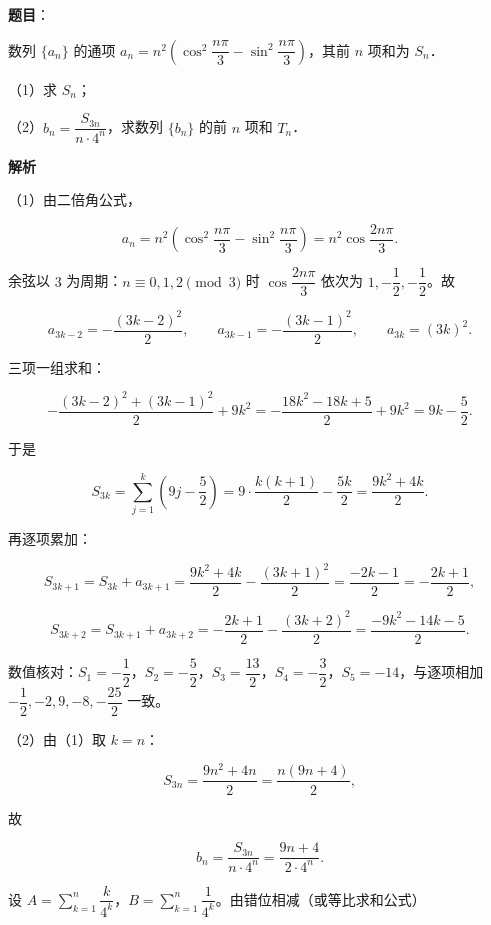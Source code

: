 \begin{answer}

\textbf{题目}：

数列 $\{a_n\}$ 的通项 $a_n=n^2\left(\cos^2\dfrac{n\pi}{3}-\sin^2\dfrac{n\pi}{3}\right)$，其前 $n$ 项和为 $S_n$．

（1）求 $S_n$；

（2）$b_n=\dfrac{S_{3n}}{n\cdot4^n}$，求数列 $\{b_n\}$ 的前 $n$ 项和 $T_n$．

\textbf{解析}

（1）由二倍角公式，

\nopagebreak[4]
\[a_n=n^2\left(\cos^2\frac{n\pi}{3}-\sin^2\frac{n\pi}{3}\right)=n^2\cos\frac{2n\pi}{3}.\]

余弦以 $3$ 为周期：$n\equiv0,1,2\pmod 3$ 时 $\cos\dfrac{2n\pi}{3}$ 依次为 $1,-\dfrac12,-\dfrac12$。故

\nopagebreak[4]
\[a_{3k-2}=-\frac{(3k-2)^2}{2},\qquad a_{3k-1}=-\frac{(3k-1)^2}{2},\qquad a_{3k}=(3k)^2.\]

三项一组求和：

\nopagebreak[4]
\[-\frac{(3k-2)^2+(3k-1)^2}{2}+9k^2=-\frac{18k^2-18k+5}{2}+9k^2=9k-\frac52.\]

于是

\nopagebreak[4]
\[S_{3k}=\sum_{j=1}^{k}\left(9j-\frac52\right)=9\cdot\frac{k(k+1)}{2}-\frac{5k}{2}=\frac{9k^2+4k}{2}.\]

再逐项累加：

\nopagebreak[4]
\[S_{3k+1}=S_{3k}+a_{3k+1}=\frac{9k^2+4k}{2}-\frac{(3k+1)^2}{2}=\frac{-2k-1}{2}=-\frac{2k+1}{2},\]

\nopagebreak[4]
\[S_{3k+2}=S_{3k+1}+a_{3k+2}=-\frac{2k+1}{2}-\frac{(3k+2)^2}{2}=\frac{-9k^2-14k-5}{2}.\]

数值核对：$S_1=-\dfrac12$，$S_2=-\dfrac52$，$S_3=\dfrac{13}{2}$，$S_4=-\dfrac32$，$S_5=-14$，与逐项相加 $-\dfrac12,-2,9,-8,-\dfrac{25}{2}$ 一致。

（2）由（1）取 $k=n$：

\nopagebreak[4]
\[S_{3n}=\frac{9n^2+4n}{2}=\frac{n(9n+4)}{2},\]

故

\nopagebreak[4]
\[b_n=\frac{S_{3n}}{n\cdot4^n}=\frac{9n+4}{2\cdot4^n}.\]

设 $A=\sum\limits_{k=1}^{n}\dfrac{k}{4^k}$，$B=\sum\limits_{k=1}^{n}\dfrac1{4^k}$。由错位相减（或等比求和公式）


\end{answer}
